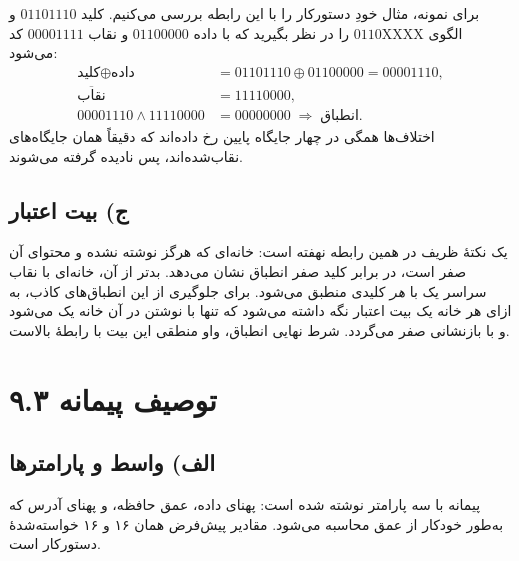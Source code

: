 \documentclass[12pt,a4paper]{article}
\begin{document}
	برای نمونه، مثال خودِ دستورکار را با این رابطه بررسی می‌کنیم. کلید \(01101110\) و الگوی \(0110\mathrm{XXXX}\) را در نظر بگیرید که با داده \(01100000\) و نقاب \(00001111\) کد می‌شود:
	\[
	\begin{aligned}
	\text{کلید} \oplus \text{داده} &= 01101110 \oplus 01100000 = 00001110,\\
	\overline{\text{نقاب}} &= 11110000,\\
	00001110 \wedge 11110000 &= 00000000 \;\Rightarrow\; \text{انطباق}.
	\end{aligned}
	\]
	اختلاف‌ها همگی در چهار جایگاه پایین رخ داده‌اند که دقیقاً همان جایگاه‌های نقاب‌شده‌اند، پس نادیده گرفته می‌شوند.

	\subsection*{ج) بیت اعتبار}
	یک نکتهٔ ظریف در همین رابطه نهفته است: خانه‌ای که هرگز نوشته نشده و محتوای آن صفر است، در برابر کلید صفر انطباق نشان می‌دهد. بدتر از آن، خانه‌ای با نقاب سراسر یک با \emph{هر} کلیدی منطبق می‌شود. برای جلوگیری از این انطباق‌های کاذب، به ازای هر خانه یک بیت اعتبار نگه داشته می‌شود که تنها با نوشتن در آن خانه یک می‌شود و با بازنشانی صفر می‌گردد. شرط نهایی انطباق، واو منطقی این بیت با رابطهٔ بالاست.

	\section*{۹.۳ توصیف پیمانه}
	\subsection*{الف) واسط و پارامترها}
	پیمانه با سه پارامتر نوشته شده است: پهنای داده، عمق حافظه، و پهنای آدرس که به‌طور خودکار از عمق محاسبه می‌شود. مقادیر پیش‌فرض همان ۱۶ و ۱۶ خواسته‌شدهٔ دستورکار است.
\end{document}
